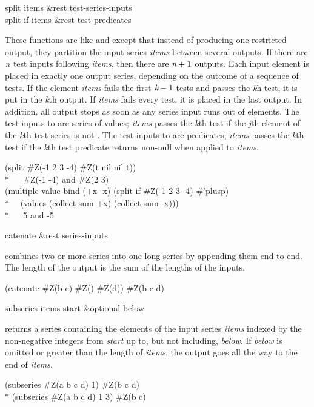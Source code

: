 \begin{defun}[Function]
split items &rest test-series-inputs \\
split-if items &rest test-predicates

These functions are like  and  except that
instead of producing one restricted output, they partition the input series
\emph{items} between several outputs.  If there are $\emph{n}$ test inputs
following \emph{items}, then there are $\emph{n}+1$ outputs.  Each input element is
placed in exactly one output series, depending on the outcome of a sequence
of tests.  If the element \emph{items} fails the first $\emph{k}-1$ tests and
passes the \emph{k\/}h test, it is put in the \emph{k\/}th output.
If \emph{items}
fails every test, it is placed in the last output.  In addition, all output
stops as soon as any series input runs out of elements.  The test inputs to
 are series of values; \emph{items} passes the \emph{k\/}th test
if the \emph{j\/}th element of the \emph{k\/}th test series is not .  The test
inputs to  are predicates; \emph{items} passes the \emph{k\/}th
test if the \emph{k\/}th test predicate returns non-null when applied to {\it
items}.
\begin{lisp}
(split \#Z(-1 2 3 -4) \#Z(t nil nil t)) \\*
~~{\EV} \#Z(-1 -4) {\rm and} \#Z(2 3) \\
(multiple-value-bind (+x -x) (split-if  \#Z(-1 2 3 -4) \#'plusp) \\*
~~(values (collect-sum +x) (collect-sum -x))) \\*
~~{\EV} 5 {\rm and} -5
\end{lisp}
\end{defun}

\begin{defun}[Function]
catenate &rest series-inputs

 combines two or more series into one long series by appending
them end to end.  The length of the output is the sum of the lengths of the
inputs.
\begin{lisp}
(catenate \#Z(b c) \#Z() \#Z(d)) {\EV} \#Z(b c d)
\end{lisp}
\end{defun}

\begin{defun}[Function]
subseries items start &optional below

 returns a series containing the elements of the input
series \emph{items} indexed by the non-negative integers from \emph{start} up
to, but not including, \emph{below}.  If \emph{below} is omitted or greater
than the length of \emph{items}, the output goes all the way to the end
of \emph{items}.
\begin{lisp}
(subseries \#Z(a b c d) 1) {\EV} \#Z(b c d) \\*
(subseries \#Z(a b c d) 1 3) {\EV} \#Z(b c)
\end{lisp}
\end{defun}

